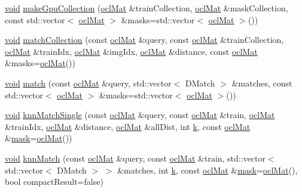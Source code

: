 \begin{DoxyCompactItemize}
\item 
\hyperlink{legacy_8hpp_a8bb47f092d473522721002c86c13b94e}{void} \hyperlink{classcv_1_1ocl_1_1BruteForceMatcher__OCL__base_a7093dd7a7518585fca7058cdd812d347}{make\-Gpu\-Collection} (\hyperlink{classcv_1_1ocl_1_1oclMat}{ocl\-Mat} \&train\-Collection, \hyperlink{classcv_1_1ocl_1_1oclMat}{ocl\-Mat} \&mask\-Collection, const std\-::vector$<$ \hyperlink{classcv_1_1ocl_1_1oclMat}{ocl\-Mat} $>$ \&masks=std\-::vector$<$ \hyperlink{classcv_1_1ocl_1_1oclMat}{ocl\-Mat} $>$())
\item 
\hyperlink{legacy_8hpp_a8bb47f092d473522721002c86c13b94e}{void} \hyperlink{classcv_1_1ocl_1_1BruteForceMatcher__OCL__base_ad203d9c1a6c759596ee835373e9e4296}{match\-Collection} (const \hyperlink{classcv_1_1ocl_1_1oclMat}{ocl\-Mat} \&query, const \hyperlink{classcv_1_1ocl_1_1oclMat}{ocl\-Mat} \&train\-Collection, \hyperlink{classcv_1_1ocl_1_1oclMat}{ocl\-Mat} \&train\-Idx, \hyperlink{classcv_1_1ocl_1_1oclMat}{ocl\-Mat} \&img\-Idx, \hyperlink{classcv_1_1ocl_1_1oclMat}{ocl\-Mat} \&distance, const \hyperlink{classcv_1_1ocl_1_1oclMat}{ocl\-Mat} \&masks=\hyperlink{classcv_1_1ocl_1_1oclMat}{ocl\-Mat}())
\item 
\hyperlink{legacy_8hpp_a8bb47f092d473522721002c86c13b94e}{void} \hyperlink{classcv_1_1ocl_1_1BruteForceMatcher__OCL__base_a8a42378671aff0139207cfff72022151}{match} (const \hyperlink{classcv_1_1ocl_1_1oclMat}{ocl\-Mat} \&query, std\-::vector$<$ D\-Match $>$ \&matches, const std\-::vector$<$ \hyperlink{classcv_1_1ocl_1_1oclMat}{ocl\-Mat} $>$ \&masks=std\-::vector$<$ \hyperlink{classcv_1_1ocl_1_1oclMat}{ocl\-Mat} $>$())
\item 
\hyperlink{legacy_8hpp_a8bb47f092d473522721002c86c13b94e}{void} \hyperlink{classcv_1_1ocl_1_1BruteForceMatcher__OCL__base_a41167c939c05786ec559c14ef45f2814}{knn\-Match\-Single} (const \hyperlink{classcv_1_1ocl_1_1oclMat}{ocl\-Mat} \&query, const \hyperlink{classcv_1_1ocl_1_1oclMat}{ocl\-Mat} \&train, \hyperlink{classcv_1_1ocl_1_1oclMat}{ocl\-Mat} \&train\-Idx, \hyperlink{classcv_1_1ocl_1_1oclMat}{ocl\-Mat} \&distance, \hyperlink{classcv_1_1ocl_1_1oclMat}{ocl\-Mat} \&all\-Dist, int \hyperlink{legacy_8hpp_a7be9b6436e5ea72ff5d5a66779b4bd38}{k}, const \hyperlink{classcv_1_1ocl_1_1oclMat}{ocl\-Mat} \&\hyperlink{tracking_8hpp_a6b13ecd2fd6ec7ad422f1d7863c3ad19}{mask}=\hyperlink{classcv_1_1ocl_1_1oclMat}{ocl\-Mat}())
\item 
\hyperlink{legacy_8hpp_a8bb47f092d473522721002c86c13b94e}{void} \hyperlink{classcv_1_1ocl_1_1BruteForceMatcher__OCL__base_a75df85ed9c69e745e20188f6eca4f27d}{knn\-Match} (const \hyperlink{classcv_1_1ocl_1_1oclMat}{ocl\-Mat} \&query, const \hyperlink{classcv_1_1ocl_1_1oclMat}{ocl\-Mat} \&train, std\-::vector$<$ std\-::vector$<$ D\-Match $>$ $>$ \&matches, int \hyperlink{legacy_8hpp_a7be9b6436e5ea72ff5d5a66779b4bd38}{k}, const \hyperlink{classcv_1_1ocl_1_1oclMat}{ocl\-Mat} \&\hyperlink{tracking_8hpp_a6b13ecd2fd6ec7ad422f1d7863c3ad19}{mask}=\hyperlink{classcv_1_1ocl_1_1oclMat}{ocl\-Mat}(), bool compact\-Result=false)

\end{DoxyCompactItemize}
